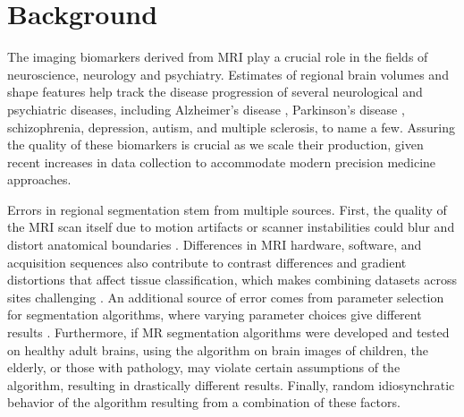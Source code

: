 \section{Background}


The imaging biomarkers derived from MRI play a crucial role in the fields of neuroscience, neurology and psychiatry. Estimates of regional brain volumes and shape features help track the disease progression of several neurological and psychiatric diseases, including Alzheimer's disease \cite{Vemuri_2010}, Parkinson's disease \cite{Silvia_Mangia_2013}, schizophrenia\cite{shenton2001review}, depression\cite{meisenzahl2011structural}, autism\cite{brambilla2003brain}, and multiple sclerosis\cite{Filippi_1995}, to name a few. Assuring the quality of these biomarkers is crucial as we scale their production, given recent increases in data collection to accommodate modern precision medicine approaches. 

Errors in regional segmentation stem from multiple sources. First, the quality of the MRI scan itself due to motion artifacts or scanner instabilities could blur and distort anatomical boundaries \cite{Blumenthal_2002}. Differences in MRI hardware, software, and acquisition sequences also contribute to contrast differences and gradient distortions that affect tissue classification, which makes combining datasets across sites challenging \cite{keshavan2016power}. An additional source of error comes from parameter selection for segmentation algorithms, where varying parameter choices give different results \cite{Han_2006}. Furthermore, if MR segmentation algorithms were developed and tested on healthy adult brains, using the algorithm on brain images of children, the elderly, or those with pathology, may violate certain assumptions of the algorithm, resulting in drastically different results. Finally, random idiosynchratic behavior of the algorithm resulting from a combination of these factors.

